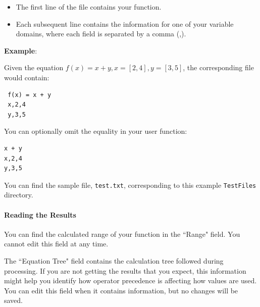 \documentclass[12pt]{article}
\begin{document}
\begin{itemize}
	\item The first line of the file contains your function.
	\item Each subsequent line contains the information for one of your 
	variable domains, where each field is separated by a comma (,).
\end{itemize}

\textbf{Example}:

Given the equation $f(x) = x + y, x = [2, 4], y = [3, 5]$, the corresponding 
file 
would contain:

 \begin{lstlisting}
 f(x) = x + y
 x,2,4
 y,3,5
 \end{lstlisting}
 
 You can optionally omit the equality in your user function:
 
\begin{lstlisting}
x + y
x,2,4
y,3,5
\end{lstlisting}

You can find the sample file, \texttt{test.txt}, corresponding to this example 
\texttt{TestFiles} directory.

\paragraph{Reading the Results\\}
You can find the calculated range of your function in the ``Range" field. You 
cannot edit this field at any time.

The ``Equation Tree" field contains the calculation tree followed during 
processing. If you are not getting the results that you expect, this 
information might help you identify how operator precedence is affecting how 
values are used. You can edit this field when it contains information, but no 
changes will be saved.
\end{document}
